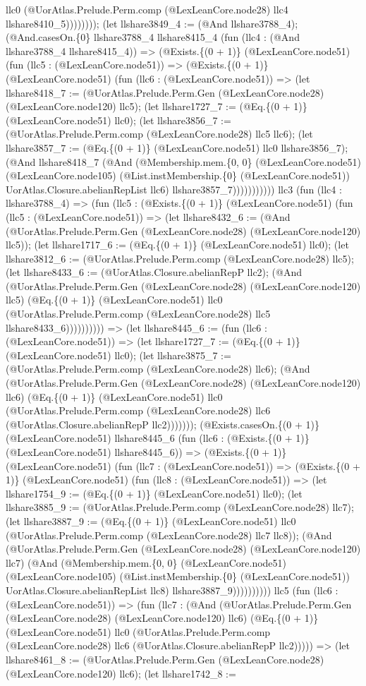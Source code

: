 \documentclass[11pt]{article}
\begin{document}
llc0 (@UorAtlas.Prelude.Perm.comp (@LexLeanCore.node28) llc4 llshare8410\_5)))))))); (let llshare3849\_4 := (@And llshare3788\_4); (@And.casesOn.\{0\} llshare3788\_4 llshare8415\_4 (fun (llc4 : (@And llshare3788\_4 llshare8415\_4)) => (@Exists.\{(0 + 1)\} (@LexLeanCore.node51) (fun (llc5 : (@LexLeanCore.node51)) => (@Exists.\{(0 + 1)\} (@LexLeanCore.node51) (fun (llc6 : (@LexLeanCore.node51)) => (let llshare8418\_7 := (@UorAtlas.Prelude.Perm.Gen (@LexLeanCore.node28) (@LexLeanCore.node120) llc5); (let llshare1727\_7 := (@Eq.\{(0 + 1)\} (@LexLeanCore.node51) llc0); (let llshare3856\_7 := (@UorAtlas.Prelude.Perm.comp (@LexLeanCore.node28) llc5 llc6); (let llshare3857\_7 := (@Eq.\{(0 + 1)\} (@LexLeanCore.node51) llc0 llshare3856\_7); (@And llshare8418\_7 (@And (@Membership.mem.\{0, 0\} (@LexLeanCore.node51) (@LexLeanCore.node105) (@List.instMembership.\{0\} (@LexLeanCore.node51)) UorAtlas.Closure.abelianRepList llc6) llshare3857\_7))))))))))) llc3 (fun (llc4 : llshare3788\_4) => (fun (llc5 : (@Exists.\{(0 + 1)\} (@LexLeanCore.node51) (fun (llc5 : (@LexLeanCore.node51)) => (let llshare8432\_6 := (@And (@UorAtlas.Prelude.Perm.Gen (@LexLeanCore.node28) (@LexLeanCore.node120) llc5)); (let llshare1717\_6 := (@Eq.\{(0 + 1)\} (@LexLeanCore.node51) llc0); (let llshare3812\_6 := (@UorAtlas.Prelude.Perm.comp (@LexLeanCore.node28) llc5); (let llshare8433\_6 := (@UorAtlas.Closure.abelianRepP llc2); (@And (@UorAtlas.Prelude.Perm.Gen (@LexLeanCore.node28) (@LexLeanCore.node120) llc5) (@Eq.\{(0 + 1)\} (@LexLeanCore.node51) llc0 (@UorAtlas.Prelude.Perm.comp (@LexLeanCore.node28) llc5 llshare8433\_6)))))))))) => (let llshare8445\_6 := (fun (llc6 : (@LexLeanCore.node51)) => (let llshare1727\_7 := (@Eq.\{(0 + 1)\} (@LexLeanCore.node51) llc0); (let llshare3875\_7 := (@UorAtlas.Prelude.Perm.comp (@LexLeanCore.node28) llc6); (@And (@UorAtlas.Prelude.Perm.Gen (@LexLeanCore.node28) (@LexLeanCore.node120) llc6) (@Eq.\{(0 + 1)\} (@LexLeanCore.node51) llc0 (@UorAtlas.Prelude.Perm.comp (@LexLeanCore.node28) llc6 (@UorAtlas.Closure.abelianRepP llc2))))))); (@Exists.casesOn.\{(0 + 1)\} (@LexLeanCore.node51) llshare8445\_6 (fun (llc6 : (@Exists.\{(0 + 1)\} (@LexLeanCore.node51) llshare8445\_6)) => (@Exists.\{(0 + 1)\} (@LexLeanCore.node51) (fun (llc7 : (@LexLeanCore.node51)) => (@Exists.\{(0 + 1)\} (@LexLeanCore.node51) (fun (llc8 : (@LexLeanCore.node51)) => (let llshare1754\_9 := (@Eq.\{(0 + 1)\} (@LexLeanCore.node51) llc0); (let llshare3885\_9 := (@UorAtlas.Prelude.Perm.comp (@LexLeanCore.node28) llc7); (let llshare3887\_9 := (@Eq.\{(0 + 1)\} (@LexLeanCore.node51) llc0 (@UorAtlas.Prelude.Perm.comp (@LexLeanCore.node28) llc7 llc8)); (@And (@UorAtlas.Prelude.Perm.Gen (@LexLeanCore.node28) (@LexLeanCore.node120) llc7) (@And (@Membership.mem.\{0, 0\} (@LexLeanCore.node51) (@LexLeanCore.node105) (@List.instMembership.\{0\} (@LexLeanCore.node51)) UorAtlas.Closure.abelianRepList llc8) llshare3887\_9)))))))))) llc5 (fun (llc6 : (@LexLeanCore.node51)) => (fun (llc7 : (@And (@UorAtlas.Prelude.Perm.Gen (@LexLeanCore.node28) (@LexLeanCore.node120) llc6) (@Eq.\{(0 + 1)\} (@LexLeanCore.node51) llc0 (@UorAtlas.Prelude.Perm.comp (@LexLeanCore.node28) llc6 (@UorAtlas.Closure.abelianRepP llc2))))) => (let llshare8461\_8 := (@UorAtlas.Prelude.Perm.Gen (@LexLeanCore.node28) (@LexLeanCore.node120) llc6); (let llshare1742\_8 := 
\end{document}
